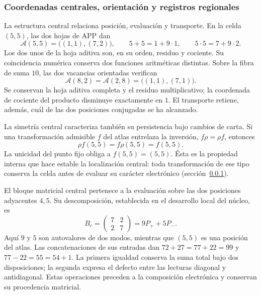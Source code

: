 \subsubsection{Coordenadas centrales, orientación y registros regionales}
\label{el-centro:registros}

La estructura central relaciona posición, evaluación y transporte. En la
celda \((5,5)\), las dos hojas de APP dan
\begin{equation}
 \mathcal A(5,5)=\bigl((1,1),(7,2)\bigr),\qquad
 5+5=1+9\cdot1,\qquad5\cdot5=7+9\cdot2.
 \label{el-centro:app}
\end{equation}
Los dos unos de la hoja aditiva son, en su orden, residuo y cociente.
Su coincidencia numérica conserva dos funciones aritméticas distintas.
Sobre la fibra de suma \(10\), las dos vacancias orientadas verifican
\begin{equation}
 \mathcal A(8,2)=\mathcal A(2,8)=\bigl((1,1),(7,1)\bigr).
 \label{el-centro:vacancias}
\end{equation}
Se conservan la hoja aditiva completa y el residuo multiplicativo;
la coordenada de cociente del producto disminuye exactamente en
\(1\). El transporte retiene, además, cuál de las dos posiciones
conjugadas se ha alcanzado.



La simetría central caracteriza también su persistencia bajo cambios de
carta. Si una transformación admisible \(f\) del atlas entrelaza la
inversión, \(f\rho=\rho f\), entonces
\[
 \rho f(5,5)=f\rho(5,5)=f(5,5).
\]
La unicidad del punto fijo obliga a \(f(5,5)=(5,5)\). Ésta es la
propiedad interna que hace estable la localización central: toda
transformación de ese tipo conserva la celda antes de evaluar su
carácter electrónico (sección~\ref{el-centro:registros}).

El bloque matricial central pertenece a la evaluación sobre las dos
posiciones adyacentes \(4,5\). Su descomposición, establecida en el
desarrollo local del núcleo, es
\[
 B_c=\begin{pmatrix}7&2\\2&7\end{pmatrix}=9P_++5P_-.
\]
Aquí \(9\) y \(5\) son autovalores de dos modos, mientras que
\((5,5)\) es una posición del atlas. Las concatenaciones de sus
entradas dan \(72+27=77+22=99\) y
\(77-22=55=54+1\). La primera igualdad conserva la suma total bajo
dos disposiciones; la segunda expresa el defecto entre las lecturas
diagonal y antidiagonal. Estas operaciones preceden a la composición
electrónica y conservan su procedencia matricial.

